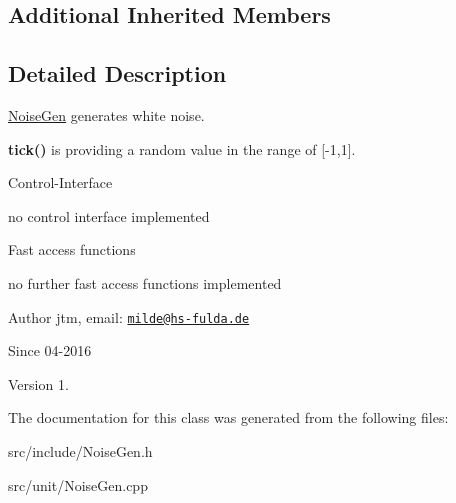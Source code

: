 \subsection*{Additional Inherited Members}


\subsection{Detailed Description}
\hyperlink{classunit_1_1NoiseGen}{Noise\-Gen} generates white noise.


\begin{DoxyItemize}
\item {\bfseries tick()} is providing a random value in the range of \mbox{[}-\/1,1\mbox{]}.
\end{DoxyItemize}

Control-\/\-Interface
\begin{DoxyItemize}
\item no control interface implemented
\end{DoxyItemize}

Fast access functions
\begin{DoxyItemize}
\item no further fast access functions implemented
\end{DoxyItemize}

\begin{DoxyAuthor}{Author}
jtm, email\-:  \href{mailto:milde@hs-fulda.de}{\tt milde@hs-\/fulda.\-de} 
\end{DoxyAuthor}
\begin{DoxySince}{Since}
04-\/2016 
\end{DoxySince}
\begin{DoxyVersion}{Version}
1. 
\end{DoxyVersion}


The documentation for this class was generated from the following files\-:\begin{DoxyCompactItemize}
\item 
src/include/Noise\-Gen.\-h\item 
src/unit/Noise\-Gen.\-cpp\end{DoxyCompactItemize}
